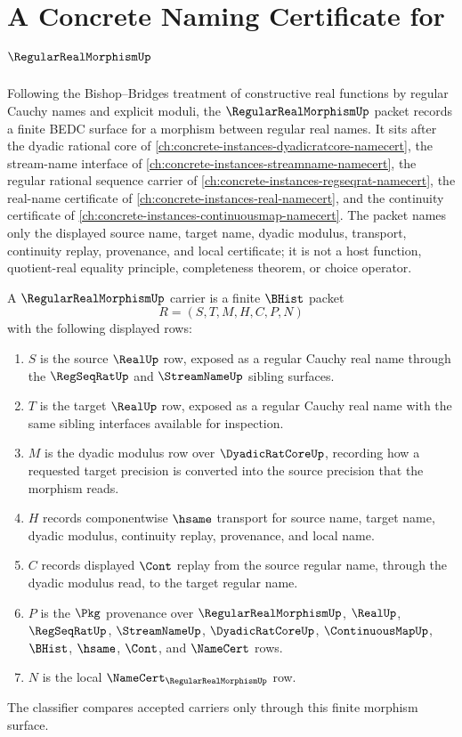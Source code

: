 \chapter{A Concrete Naming Certificate for $\RegularRealMorphismUp$}
\label{ch:concrete-instances-regular-real-morphism-namecert}

Following the Bishop--Bridges treatment of constructive real functions by regular Cauchy names and explicit moduli, the $\RegularRealMorphismUp$ packet records a finite BEDC surface for a morphism between regular real names. It sits after the dyadic rational core of \autoref{ch:concrete-instances-dyadicratcore-namecert}, the stream-name interface of \autoref{ch:concrete-instances-streamname-namecert}, the regular rational sequence carrier of \autoref{ch:concrete-instances-regseqrat-namecert}, the real-name certificate of \autoref{ch:concrete-instances-real-namecert}, and the continuity certificate of \autoref{ch:concrete-instances-continuousmap-namecert}. The packet names only the displayed source name, target name, dyadic modulus, transport, continuity replay, provenance, and local certificate; it is not a host function, quotient-real equality principle, completeness theorem, or choice operator.

\begin{definition}
\label{def:regular-real-morphism-carrier}
A $\RegularRealMorphismUp$ carrier is a finite $\BHist$ packet
$$
R=(S,T,M,H,C,P,N)
$$
with the following displayed rows:
\begin{enumerate}
\item $S$ is the source $\RealUp$ row, exposed as a regular Cauchy real name through the $\RegSeqRatUp$ and $\StreamNameUp$ sibling surfaces.
\item $T$ is the target $\RealUp$ row, exposed as a regular Cauchy real name with the same sibling interfaces available for inspection.
\item $M$ is the dyadic modulus row over $\DyadicRatCoreUp$, recording how a requested target precision is converted into the source precision that the morphism reads.
\item $H$ records componentwise $\hsame$ transport for source name, target name, dyadic modulus, continuity replay, provenance, and local name.
\item $C$ records displayed $\Cont$ replay from the source regular name, through the dyadic modulus read, to the target regular name.
\item $P$ is the $\Pkg$ provenance over $\RegularRealMorphismUp$, $\RealUp$, $\RegSeqRatUp$, $\StreamNameUp$, $\DyadicRatCoreUp$, $\ContinuousMapUp$, $\BHist$, $\hsame$, $\Cont$, and $\NameCert$ rows.
\item $N$ is the local $\NameCert_{\RegularRealMorphismUp}$ row.
\end{enumerate}
The classifier compares accepted carriers only through this finite morphism surface.
\end{definition}

